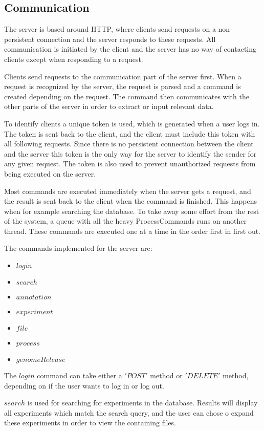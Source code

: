 \label{chap:com_systemdesign}
\subsection{Communication}
The server is based around HTTP, where clients send requests on a non-persistent connection and the server responds to these requests. All communication is initiated by the client and the server has no way of contacting clients except when responding to a request. 

Clients send requests to the communication part of the server first. When a request is recognized by the server, the request is parsed and a command is created depending on the request. The command then communicates with the other parts of the server in order to extract or input relevant data. 

To identify clients a unique token is used, which is generated when a user logs in. The token is sent back to the client, and the client must include this token with all following requests. Since there is no persistent connection between the client and the server this token is the only way for the server to identify the sender for any given request. The token is also used to prevent unauthorized requests from being executed on the server.

Most commands are executed immediately when the server gets a request, and the result is sent back to the client when the command is finished. This happens when for example searching the database. To take away some effort from the rest of the system, a queue with all the heavy ProcessCommands runs on another thread. These commands are executed one at a time in the order first in first out. 

The commands implemented for the server are:

\begin{itemize}
	\item $login$
	\item $search$
	\item $annotation$
	\item $experiment$
	\item $file$
	\item $process$
	\item $genomeRelease$
\end{itemize}

The $login$ command can take either a $'POST'$ method or $'DELETE'$ method, depending on if the user wants to log in or log out. 

$search$ is used for searching for experiments in the database. Results will display all experiments which match the search query, and the user can chose o expand these experiments in order to view the containing files. 

